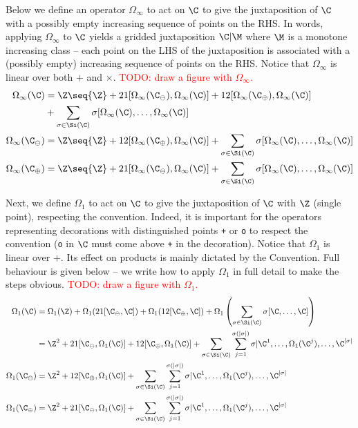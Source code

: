 Below we define an operator $\Omega_\infty$ to act on $\C$ to give the juxtaposition of $\C$ with a possibly empty increasing sequence of points on the RHS. In words, applying $\Omega_\infty$ to $\C$ yields a gridded juxtaposition $\C|\M$ where $\M$ is a monotone increasing class -- each point on the LHS of the juxtaposition is associated with a (possibly empty) increasing sequence of points on the RHS. Notice that $\Omega_\infty$ is linear over both $+$ and $\times$.
\textcolor{red}{TODO: draw a figure with $\Omega_\infty$.} 
\begin{align*}
  \Omega_\infty(\C)   &= \Z \seq{\Z} + 21[\Omega_\infty(\C_\ominus), \Omega_\infty(\C)] + 12[\Omega_\infty(\C_\oplus), \Omega_\infty(\C)] \\
                     &+ \sum_{\sigma \in \Si(\C)}\sigma[\Omega_\infty(\C),\ldots,\Omega_\infty(\C)]\\
  \Omega_\infty(\C_\ominus) &= \Z \seq{\Z} + 12[\Omega_\infty(\C_\oplus),\Omega_\infty(\C)] + \sum_{\sigma \in \Si(\C)}\sigma[\Omega_\infty(\C),\ldots,\Omega_\infty(\C)]\\
  \Omega_\infty(\C_\oplus) &= \Z \seq{\Z} + 21[\Omega_\infty(\C_\ominus),\Omega_\infty(\C)] + \sum_{\sigma \in \Si(\C)}\sigma[\Omega_\infty(\C),\ldots,\Omega_\infty(\C)]
\end{align*}

Next, we define $\Omega_1$ to act on $\C$ to give the juxtaposition of $\C$ with $\Z$ (single point), respecting the convention. Indeed, it is important for the operators representing decorations with distinguished points \texttt{+} or \texttt{o} to respect the convention (\texttt{o} in $\C$ must come above \texttt{+} in the decoration). Notice that $\Omega_1$ is linear over $+$. Its effect on products is mainly dictated by the Convention. Full behaviour is given below -- we write how to apply $\Omega_1$ in full detail to make the steps obvious.
\textcolor{red}{TODO: draw a figure with $\Omega_1$.} 
\begin{align*}
  \Omega_1(\C)   &= \Omega_1(\Z) + \Omega_1(21[\C_\ominus,\C]) + \Omega_1(12[\C_\oplus, \C]) + \Omega_1\left(\sum_{\sigma \in \Si(\C)}\sigma[\C,\ldots,\C]\right)\\
                 &= \Z^2 + 21[\C_\ominus, \Omega_1(\C)] + 12[\C_\oplus, \Omega_1(\C)] + \sum_{\sigma \in \Si(\C)}\sum_{j=1}^{\sigma(|\sigma|)}\sigma\vert{\C^1,\ldots,\Omega_1(\C^j),\ldots,\C^{|\sigma|}}\\
  \Omega_1(\C_\ominus) &= \Z^2 + 12[\C_\oplus,\Omega_1(\C)] + \sum_{\sigma \in \Si(\C)}\sum_{j=1}^{\sigma(|\sigma|)}\sigma\vert{\C^1,\ldots,\Omega_1(\C^j),\ldots,\C^{|\sigma|}}\\
  \Omega_1(\C_\oplus) &= \Z^2 + 21[\C_\ominus,\Omega_1(\C)] + \sum_{\sigma \in \Si(\C)}\sum_{j=1}^{\sigma(|\sigma|)}\sigma\vert{\C^1,\ldots,\Omega_1(\C^j),\ldots,\C^{|\sigma|}}\\
\end{align*}

